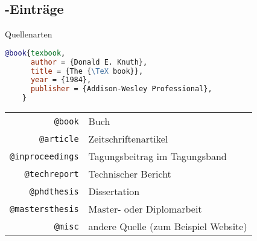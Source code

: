 \subsection{\BibTeX-Einträge}

\begin{Frame}[fragile]{Quellenarten}
  \begin{lstlisting}[gobble=4,language=BibTeX]
    @book{texbook,
      author = {Donald E. Knuth},
      title = {The {\TeX book}},
      year = {1984},
      publisher = {Addison-Wesley Professional},
    }
  \end{lstlisting}

  \xxx

  \lstset{language=BibTeX}
  \begin{tabular}{r@{ }l}
    \lstinline-@book- & Buch \\
    \lstinline-@article- & Zeitschriftenartikel \\
    \lstinline-@inproceedings- & Tagungsbeitrag im Tagungsband \\
    \lstinline-@techreport- & Technischer Bericht \\
    \lstinline-@phdthesis- & Dissertation \\
    \lstinline-@mastersthesis- & Master- oder Diplomarbeit \\
    \lstinline-@misc- & andere Quelle (zum Beispiel Website)
  \end{tabular}
\end{Frame}

